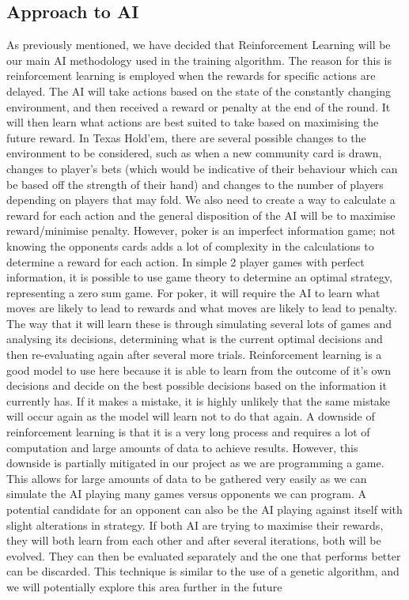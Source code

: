 \documentclass{article}
\begin{document}
\begin{multicols*}{2}
\section{Approach to AI}
As previously mentioned, we have decided that Reinforcement Learning will be our main AI methodology used in the training algorithm. The reason for this is reinforcement learning is employed when the rewards for specific actions are delayed. The AI will take actions based on the state of the constantly changing environment, and then received a reward or penalty at the end of the round. It will then learn what actions are best suited to take based on maximising the future reward. In Texas Hold'em, there are several possible changes to the environment to be considered, such as when a new community card is drawn, changes to player's bets (which would be indicative of their behaviour which can be based off the strength of their hand) and changes to the number of players depending on players that may fold.
\newline
We also need to create a way to calculate a reward for each action and the general disposition of the AI will be to maximise reward/minimise penalty. However, poker is an imperfect information game; not knowing the opponents cards adds a lot of complexity in the calculations to determine a reward for each action. In simple 2 player games with perfect information, it is possible to use game theory to determine an optimal strategy, representing a zero sum game. For poker, it will require the AI to learn what moves are likely to lead to rewards and what moves are likely to lead to penalty. The way that it will learn these is through simulating several lots of games and analysing its decisions, determining what is the current optimal decisions and then re-evaluating again after several more trials.
\newline
Reinforcement learning is a good model to use here because it is able to learn from the outcome of it's own decisions and decide on the best possible decisions based on the information it currently has. If it makes a mistake, it is highly unlikely that the same mistake will occur again as the model will learn not to do that again.
\newline
A downside of reinforcement learning is that it is a very long process and requires a lot of computation and large amounts of data to achieve results. However, this downside is partially mitigated in our project as we are programming a game. This allows for large amounts of data to be gathered very easily as we can simulate the AI playing many games versus opponents we can program. A potential candidate for an opponent can also be the AI playing against itself with slight alterations in strategy. If both AI are trying to maximise their rewards, they will both learn from each other and after several iterations, both will be evolved. They can then be evaluated separately and the one that performs better can be discarded. This technique is similar to the use of a genetic algorithm, and we will potentially explore this area further in the future



\end{multicols*}
\end{document}
